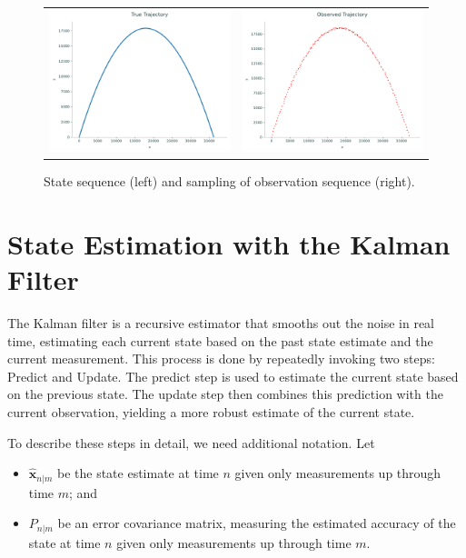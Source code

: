 \begin{figure}
    \centering
    \begin{tabular}{cc}
    \includegraphics[width=.45\textwidth]{figures/states_evolution} &
    \includegraphics[width=.45\textwidth]{figures/obs_evolution}
    \end{tabular}
    \caption{State sequence (left) and sampling of observation sequence (right).}
    \label{fig:evolution}
\end{figure}


\section*{State Estimation with the Kalman Filter}
The Kalman filter is a recursive estimator that smooths out the noise in real time, estimating each current state based on the past state estimate and the current measurement.
This process is done by repeatedly invoking two steps: Predict and Update.
The predict step is used to estimate the current state based on the previous state.
The update step then combines this prediction with the current observation, yielding a more robust estimate of the current state.

To describe these steps in detail, we need additional notation. Let
\begin{itemize}
    \item $\widehat{\mathbf{x}}_{n|m}$ be the state estimate at time $n$ given only measurements up through time $m$; and
    \item $P_{n|m}$ be an error covariance matrix, measuring the estimated accuracy of the state at time $n$ given only measurements up through time $m$.
\end{itemize}

